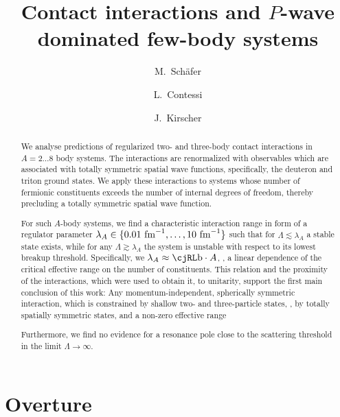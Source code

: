 \documentclass[aps,prd,onecolumn
,tightenlines,letterpaper,
notitlepage,11pt,
nofootinbib]{revtex4-1}
\begin{document}
\newenvironment{definition}[1][Definition]{\begin{trivlist}
\item[\hskip \labelsep {\textrm{\bfseries#1}}]}{\end{trivlist}}

 \author{M.~Sch\"afer}
 \author{L.~Contessi}
 \author{J.~Kirscher}


\title{
Contact interactions and $P$-wave dominated few-body systems
}
\begin{abstract}
We analyse predictions of regularized two- and three-body contact interactions
in $A=2\ldots8$ body systems. The interactions are renormalized with observables
which are associated with totally symmetric spatial wave functions, specifically, the
deuteron and triton ground states.
We apply these interactions to systems whose number of fermionic constituents exceeds the number of
internal degrees of freedom, thereby precluding a totally symmetric spatial wave function.

For such $A$-body systems, we find a characteristic interaction range in form of a regulator parameter $\lambda_A\in\lbrace 0.01~\text{fm}^{-1}, \ldots,10~\text{fm}^{-1}\rbrace$
such that for $\Lambda\lesssim\lambda_A$ a stable state exists, while for any $\Lambda\gtrsim\lambda_A$ the system is unstable
with respect to its lowest breakup threshold. Specifically, we $\lambda_A\approx\b\cdot A$, \ie, a linear dependence of the critical
effective range on the number of constituents. This relation and the proximity of the interactions, which were used to obtain it, to unitarity,
support the first main conclusion of this work: Any momentum-independent, spherically symmetric interaction, which is
constrained by shallow two- and three-particle states, \ie, by totally spatially symmetric states, and a non-zero effective range


 Furthermore, we find no evidence for a resonance pole close to the scattering
threshold in the limit $\Lambda\to\infty$.

\end{abstract}


\maketitle

\section{Overture}
\end{document}

